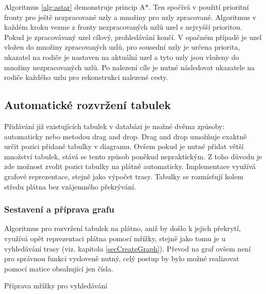 \documentclass[czech,bachelor,public,dept460,male,oneside]{diploma}
\begin{document}
	Algoritmus \ref{alg:astar} demonstruje princip A*. Ten spočívá v použití prioritní fronty pro ještě nezpracované uzly a množiny pro uzly zpracované. Algoritmus v každém kroku vezme z fronty nezpracovaných uzlů uzel s nejvyšší prioritou. Pokud je zpracovávaný uzel cílový, prohledávání končí. V opačném případě je uzel vložen do množiny zpracovaných uzlů, pro sousední uzly je určena priorita, ukazatel na rodiče je nastaven na aktuální uzel a tyto uzly jsou vloženy do množiny nezpracovaných uzlů. Po nalezení cíle je nutné následovat ukazatele na rodiče každého uzlu pro rekonstrukci nalezené cesty. 
	
	\subsection{Automatické rozvržení tabulek} \label{secTablePos}
	Přidávání již existujících tabulek v databázi je možné dvěma způsoby: automaticky nebo metodou drag and drop. Drag and drop umožňuje exaktně určit pozici přidané tabulky v diagramu. Ovšem pokud je nutné přidat větší množství tabulek, stává se tento způsob poněkud nepraktickým. Z toho důvodu je zde možnost zvolit pozici tabulky na plátně automaticky. Implementace využívá grafové reprezentace, stejně jako výpočet trasy. Tabulky se rozmísťují kolem středu plátna bez vzájemného překrývání. 
		
	\subsubsection{Sestavení a příprava grafu}
	Algoritmus pro rozvržení tabulek na plátno, aniž by došlo k jejich překrytí, využívá opět reprezentaci plátna pomocí mřížky, stejně jako tomu je u vyhledávání trasy (viz. kapitola \ref{secCreateGraph}). Převod na graf ovšem není pro správnou funkci vysloveně nutný, celý postup by bylo možné realizovat pomocí matice obsahující jen čísla.
	
	\begin{algorithm}[!h]
		
				
		
		
		\caption{Příprava mřížky pro vyhledávání}
		\label{alg:preprocessGrid}
	\end{algorithm}
\end{document}
